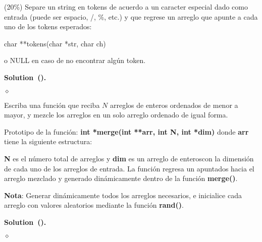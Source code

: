 \documentclass{article}
\theoremstyle{problemstyle}
\newenvironment{solution}[2]{%
  \begin{mdframed}[linewidth=0.8pt,linecolor=Gray,backgroundcolor=Gray!5,roundcorner=5pt, nobreak=#2]%
    \noindent\textbf{Solution\if\relax\detokenize{#1}\relax\else~(#1)\fi.}%
}{%
\hfill $ \diamond $ 
  \end{mdframed}%
}
\begin{document}
\begin{problem}
(20\%) Separe un string en tokens de acuerdo a un caracter especial dado como entrada (puede ser espacio, /, \%, etc.) y que regrese un arreglo que apunte a cada uno de los tokens esperados:
\begin{center}
	char **tokens(char *str, char ch)
\end{center}
o NULL en caso de no encontrar alg\'un token.

\end{problem}

\begin{solution}{}{true}

\end{solution}

\begin{problem}
Escriba una funci\'on que reciba $ N $ arreglos de enteros ordenados de menor a mayor, y mezcle los arreglos en un solo arreglo ordenado de igual forma.

Prototipo de la funci\'on:
\textbf{int *merge(int **arr, int N, int *dim)}
donde \textbf{arr} tiene la siguiente estructura:

\textbf{N} es el n\'umero total de arreglos y \textbf{dim} es un arreglo de enteroscon la dimensi\'on de cada uno de los arreglos de entrada. La funci\'on regresa un apuntados hacia el arreglo mezclado y generado din\'amicamente dentro de la funci\'on \textbf{merge()}.

\textbf{Nota}: Generar din\'amicamente todos los arreglos necesarios, e inicialice cada arreglo con valores aleatorios mediante la funci\'on \textbf{rand()}.
\end{problem}
\begin{solution}{}{true}

\end{solution}



\end{document}
